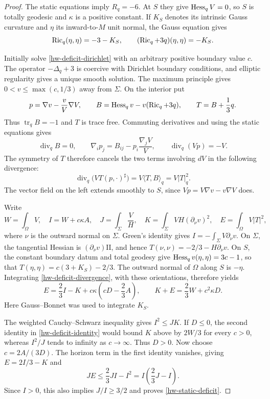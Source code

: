 \begin{proof}
The static equations imply $R_q=-6$.  At $S$ they give
$\operatorname{Hess}_qV=0$, so $S$ is totally geodesic and $\kappa$ is a positive
constant.  If $K_S$ denotes its intrinsic Gauss curvature and $\eta$
its inward-to-$M$ unit normal, the Gauss equation gives
\[
 \operatorname{Ric}_q(\eta,\eta)=-3-K_S,
 \qquad (\operatorname{Ric}_q+3q)(\eta,\eta)=-K_S.
\]

Initially solve \eqref{hw-deficit-dirichlet} with an arbitrary
positive boundary value $c$.  The operator $-\Delta_q+3$ is
coercive with Dirichlet boundary conditions, and elliptic
regularity gives a unique smooth solution.  The maximum principle
gives $0<v\leq\max(c,1/3)$ away from $\Sigma$.
On the interior put
\[
 p=\nabla v-\frac vV\nabla V,\qquad
 B=\operatorname{Hess}_qv-v(\operatorname{Ric}_q+3q),\qquad T=B+\frac13q.
\]
Thus $\operatorname{tr}_qB=-1$ and $T$ is trace free.  Commuting
derivatives and using the static equations gives
\[
 \operatorname{div}_q B=0,\qquad
 \nabla_i p_j=B_{ij}-p_i\frac{\nabla_jV}{V},\qquad
 \operatorname{div}_q(Vp)=-V.
\]
The symmetry of $T$ therefore cancels the two terms involving
$dV$ in the following divergence:
\begin{equation}\label{hw-deficit-divergence}
 \operatorname{div}_q\bigl(VT(p,\cdot)^{\sharp}\bigr)
       =V\langle T,B\rangle_q=V|T|_q^2.
\end{equation}
The vector field on the left extends smoothly to $S$, since
$Vp=V\nabla v-v\nabla V$ does.

Write
\[
 W=\int_\Omega V,\quad
 I=W+c\kappa A,\quad
 J=\int_\Sigma\frac{V}{H},\quad
 K=\int_\Sigma VH(\partial_\nu v)^2,\quad
 E=\int_\Omega V|T|^2,
\]
where $\nu$ is the outward normal on $\Sigma$.
Green's identity gives
$I=-\int_\Sigma V\partial_\nu v$.
On $\Sigma$, the tangential Hessian is
$(\partial_\nu v)\mathrm{II}$, and hence
$T(\nu,\nu)=-2/3-H\partial_\nu v$.
On $S$, the constant boundary datum and total geodesy give
$\operatorname{Hess}_qv(\eta,\eta)=3c-1$, so that
$T(\eta,\eta)=c(3+K_S)-2/3$.
The outward normal of $\Omega$ along $S$ is $-\eta$.
Integrating \eqref{hw-deficit-divergence}, with these orientations,
therefore yields
\begin{equation}\label{hw-deficit-identity}
 E=\frac23 I-K+c\kappa\left(cD-\frac23 A\right),
 \qquad K+E=\frac23W+c^2\kappa D.
\end{equation}
Here Gauss--Bonnet was used to integrate $K_S$.

The weighted Cauchy--Schwarz inequality gives $I^2\leq JK$.
If $D\leq0$, the second identity in
\eqref{hw-deficit-identity} would bound $K$ above by $2W/3$
for every $c>0$, whereas $I^2/J$ tends to infinity as
$c\to\infty$.  Thus $D>0$.
Now choose $c=2A/(3D)$.  The horizon term in the first identity
vanishes, giving $E=2I/3-K$ and
\[
 J E\leq\frac23 JI-I^2
       =I\left(\frac23J-I\right).
\]
Since $I>0$, this also implies $J/I\geq3/2$ and proves
\eqref{hw-static-deficit}.
\end{proof}

